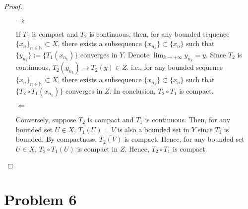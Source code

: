 \documentclass[12pt]{article}
\begin{document}
\begin{proof}

\begin{enumerate}
\item [$\Rightarrow$]

If $T_1$ is compact and $T_2$ is continuous, then, for any bounded sequence $\{x_n\}_{n\in \mathbb N} \subset X$, there exists a subsequence $\{x_{n_k}\} \subset \{x_n\}$ such that $\{y_{n_k}\} := \{T_1(x_{n_k})\}$ converges in $Y$. Denote $\lim_{k\rightarrow +\infty} y_{n_k} = y$. Since $T_2$ is continuous, $T_2(y_{n_k}) \rightarrow T_2(y)\in Z$. i.e., for any bounded sequence $\{x_n\}_{n\in \mathbb N} \subset X$, there exists a subsequence $\{x_{n_k}\} \subset \{x_n\}$ such that $\{T_2\circ T_1(x_{n_k})\}$ converges in $Z$. In conclusion, $T_2\circ T_1$ is compact.

\item [$\Leftarrow$]

Conversely, suppose $T_2$ is compact and $T_1$ is continuous. Then, for any bounded set $U\in X$, $T_1(U) = V$ is also a bounded set in $Y$ since $T_1$ is bounded. By compactness, $\overline{T_2(V)}$ is compact. Hence, for any bounded set $U\in X$, $T_2\circ T_1(U)$ is compact in $Z$. Hence, $T_2\circ T_1$ is compact.

\end{enumerate}

\end{proof}


\section*{Problem 6}
\end{document}
